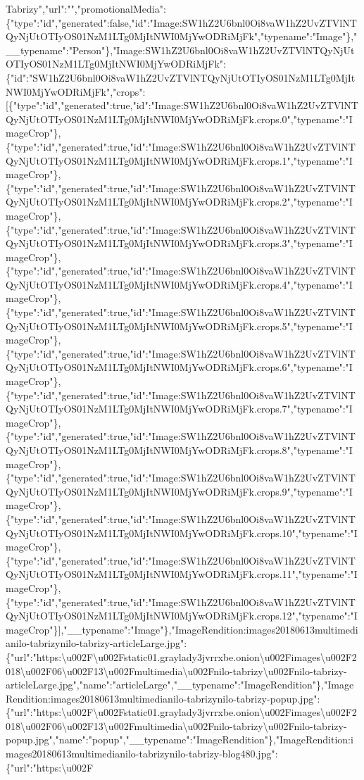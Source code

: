 Tabrizy","url":"","promotionalMedia":\{"type":"id","generated":false,"id":"Image:SW1hZ2U6bnl0Oi8vaW1hZ2UvZTVlNTQyNjUtOTIyOS01NzM1LTg0MjItNWI0MjYwODRiMjFk","typename":"Image"\},"\_\_typename":"Person"\},"Image:SW1hZ2U6bnl0Oi8vaW1hZ2UvZTVlNTQyNjUtOTIyOS01NzM1LTg0MjItNWI0MjYwODRiMjFk":\{"id":"SW1hZ2U6bnl0Oi8vaW1hZ2UvZTVlNTQyNjUtOTIyOS01NzM1LTg0MjItNWI0MjYwODRiMjFk","crops":{[}\{"type":"id","generated":true,"id":"Image:SW1hZ2U6bnl0Oi8vaW1hZ2UvZTVlNTQyNjUtOTIyOS01NzM1LTg0MjItNWI0MjYwODRiMjFk.crops.0","typename":"ImageCrop"\},\{"type":"id","generated":true,"id":"Image:SW1hZ2U6bnl0Oi8vaW1hZ2UvZTVlNTQyNjUtOTIyOS01NzM1LTg0MjItNWI0MjYwODRiMjFk.crops.1","typename":"ImageCrop"\},\{"type":"id","generated":true,"id":"Image:SW1hZ2U6bnl0Oi8vaW1hZ2UvZTVlNTQyNjUtOTIyOS01NzM1LTg0MjItNWI0MjYwODRiMjFk.crops.2","typename":"ImageCrop"\},\{"type":"id","generated":true,"id":"Image:SW1hZ2U6bnl0Oi8vaW1hZ2UvZTVlNTQyNjUtOTIyOS01NzM1LTg0MjItNWI0MjYwODRiMjFk.crops.3","typename":"ImageCrop"\},\{"type":"id","generated":true,"id":"Image:SW1hZ2U6bnl0Oi8vaW1hZ2UvZTVlNTQyNjUtOTIyOS01NzM1LTg0MjItNWI0MjYwODRiMjFk.crops.4","typename":"ImageCrop"\},\{"type":"id","generated":true,"id":"Image:SW1hZ2U6bnl0Oi8vaW1hZ2UvZTVlNTQyNjUtOTIyOS01NzM1LTg0MjItNWI0MjYwODRiMjFk.crops.5","typename":"ImageCrop"\},\{"type":"id","generated":true,"id":"Image:SW1hZ2U6bnl0Oi8vaW1hZ2UvZTVlNTQyNjUtOTIyOS01NzM1LTg0MjItNWI0MjYwODRiMjFk.crops.6","typename":"ImageCrop"\},\{"type":"id","generated":true,"id":"Image:SW1hZ2U6bnl0Oi8vaW1hZ2UvZTVlNTQyNjUtOTIyOS01NzM1LTg0MjItNWI0MjYwODRiMjFk.crops.7","typename":"ImageCrop"\},\{"type":"id","generated":true,"id":"Image:SW1hZ2U6bnl0Oi8vaW1hZ2UvZTVlNTQyNjUtOTIyOS01NzM1LTg0MjItNWI0MjYwODRiMjFk.crops.8","typename":"ImageCrop"\},\{"type":"id","generated":true,"id":"Image:SW1hZ2U6bnl0Oi8vaW1hZ2UvZTVlNTQyNjUtOTIyOS01NzM1LTg0MjItNWI0MjYwODRiMjFk.crops.9","typename":"ImageCrop"\},\{"type":"id","generated":true,"id":"Image:SW1hZ2U6bnl0Oi8vaW1hZ2UvZTVlNTQyNjUtOTIyOS01NzM1LTg0MjItNWI0MjYwODRiMjFk.crops.10","typename":"ImageCrop"\},\{"type":"id","generated":true,"id":"Image:SW1hZ2U6bnl0Oi8vaW1hZ2UvZTVlNTQyNjUtOTIyOS01NzM1LTg0MjItNWI0MjYwODRiMjFk.crops.11","typename":"ImageCrop"\},\{"type":"id","generated":true,"id":"Image:SW1hZ2U6bnl0Oi8vaW1hZ2UvZTVlNTQyNjUtOTIyOS01NzM1LTg0MjItNWI0MjYwODRiMjFk.crops.12","typename":"ImageCrop"\}{]},"\_\_typename":"Image"\},"ImageRendition:images20180613multimedianilo-tabrizynilo-tabrizy-articleLarge.jpg":\{"url":"https:\textbackslash{}u002F\textbackslash{}u002Fstatic01.graylady3jvrrxbe.onion\textbackslash{}u002Fimages\textbackslash{}u002F2018\textbackslash{}u002F06\textbackslash{}u002F13\textbackslash{}u002Fmultimedia\textbackslash{}u002Fnilo-tabrizy\textbackslash{}u002Fnilo-tabrizy-articleLarge.jpg","name":"articleLarge","\_\_typename":"ImageRendition"\},"ImageRendition:images20180613multimedianilo-tabrizynilo-tabrizy-popup.jpg":\{"url":"https:\textbackslash{}u002F\textbackslash{}u002Fstatic01.graylady3jvrrxbe.onion\textbackslash{}u002Fimages\textbackslash{}u002F2018\textbackslash{}u002F06\textbackslash{}u002F13\textbackslash{}u002Fmultimedia\textbackslash{}u002Fnilo-tabrizy\textbackslash{}u002Fnilo-tabrizy-popup.jpg","name":"popup","\_\_typename":"ImageRendition"\},"ImageRendition:images20180613multimedianilo-tabrizynilo-tabrizy-blog480.jpg":\{"url":"https:\textbackslash{}u002F\tex